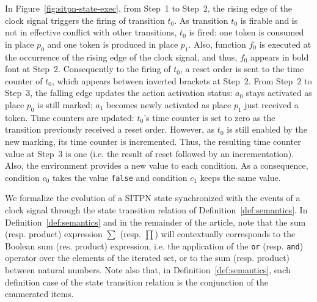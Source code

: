\documentclass[pdflatex,sn-mathphys]{sn-jnl}%
\theoremstyle{thmstyleone}%
\theoremstyle{thmstyletwo}%
\theoremstyle{thmstylethree}%
\begin{document}
In Figure~\ref{fig:sitpn-state-exec}, from Step~1 to Step~2, the
rising edge of the clock signal triggers the firing of transition
$t_0$. As transition $t_0$ is firable and is not in effective conflict
with other transitions, $t_0$ is fired: one token is consumed in place
$p_0$ and one token is produced in place $p_1$. Also, function $f_0$
is executed at the occurrence of the rising edge of the clock signal,
and thus, $f_0$ appears in bold font at Step~2. Consequently to the
firing of $t_0$, a reset order is sent to the time counter of $t_0$,
which appears between inverted brackets at Step~2. From Step~2 to
Step~3, the falling edge updates the action activation status: $a_0$
stays activated as place $p_0$ is still marked; $a_1$ becomes newly
activated as place $p_1$ just received a token. Time counters are
updated: $t_0$'s time counter is set to zero as the transition
previously received a reset order. However, as $t_0$ is still enabled
by the new marking, its time counter is incremented. Thus, the
resulting time counter value at Step~3 is one (i.e. the result of
reset followed by an incrementation). Also, the environment provides a
new value to each condition. As a consequence, condition $c_0$ takes
the value \texttt{false} and condition $c_1$ keeps the same value.

We formalize the evolution of a SITPN state synchronized with the
events of a clock signal through the state transition relation of
Definition~\ref{def:semantics}. In Definition~\ref{def:semantics} and
in the remainder of the article, note that the sum (resp. product)
expression $\sum$ (resp. $\prod$) will contextually corresponds to the
Boolean sum (res. product) expression, i.e. the application of the
\texttt{or} (resp. \texttt{and}) operator over the elements of the
iterated set, or to the sum (resp. product) between natural
numbers. Note also that, in Definition~\ref{def:semantics}, each
definition case of the state transition relation is the conjunction of
the enumerated items.
\end{document}
